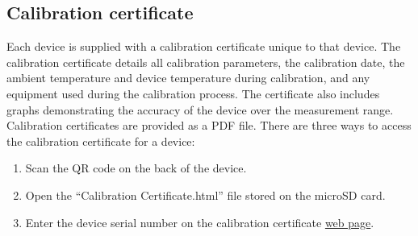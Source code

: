 \subsection{Calibration certificate}

Each device is supplied with a calibration certificate unique to that device.  The calibration certificate details all calibration parameters, the calibration date, the ambient temperature and device temperature during calibration, and any equipment used during the calibration process.  The certificate also includes graphs demonstrating the accuracy of the device over the measurement range.  Calibration certificates are provided as a \ac{PDF} file.  There are three ways to access the calibration certificate for a device:

\begin{enumerate}[nolistsep]
    \item Scan the \ac{QR} code on the back of the device.
    \item Open the \enquote{Calibration Certificate.html} file stored on the \ac{microSD} card.
    \item Enter the device serial number on the calibration certificate \href{https://x-io.co.uk/calibration-certificate/}{web page}.
\end{enumerate}
